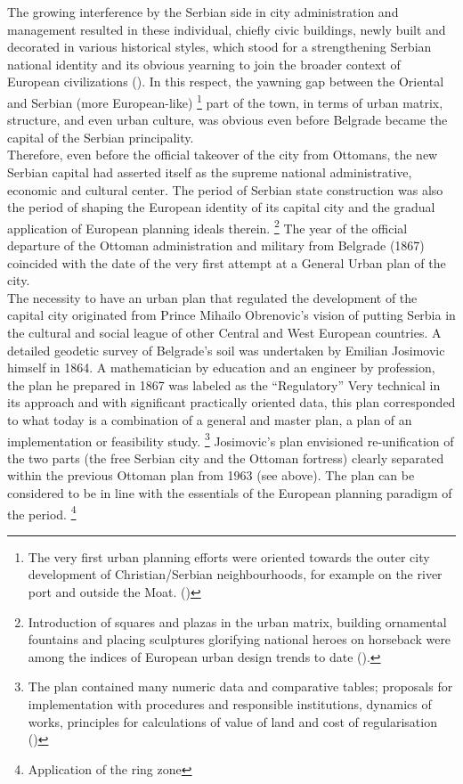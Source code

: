 \documentclass[11pt]{report}
\begin{document}
The growing interference by the Serbian side in city administration and management resulted in these individual, chiefly civic buildings, newly built and decorated in various historical styles, which stood for a strengthening Serbian national identity and its obvious yearning to join the broader context of European civilizations (\href{Hirt}{\citealt{hirt_belgrade_2009}}).
In this respect, the yawning gap between the Oriental and Serbian (more European-like)
\footnote{The very first urban planning efforts were oriented towards the outer city development of Christian/Serbian neighbourhoods, for example on the river port and outside the Moat. (\href{Blagojevic}{\citealt{blagojevic_urban_2009}})}
part of the town, in terms of urban matrix, structure, and even urban culture, was obvious even before Belgrade became the capital of the Serbian principality.
\\

Therefore, even before the official takeover of the city from Ottomans, the new Serbian capital had asserted itself as the supreme national administrative, economic and cultural center.  The period of Serbian state construction was also the period of shaping the European identity of its capital city and the gradual application of European planning ideals therein.
\footnote{Introduction of squares and plazas in the urban matrix, building ornamental fountains and placing sculptures glorifying national heroes on horseback were among the indices of European urban design trends to date (\href{Hirt}{\citealt{hirt_belgrade_2009}}).}
The year of the official departure of the Ottoman administration and military from Belgrade (1867) coincided with the date of the very first attempt at a General Urban plan of the city.
\\

The necessity to have an urban plan that regulated the development of the capital city originated from Prince Mihailo Obrenovic’s vision of putting Serbia in the cultural and social league of other Central and West European countries. A detailed geodetic survey of Belgrade’s soil was undertaken by Emilian Josimovic himself in 1864. A mathematician by education and an engineer by profession, the plan he prepared in 1867 was labeled as the “Regulatory” Very technical in its approach and with significant practically oriented data, this plan corresponded to what today is a combination of a general and master plan, a plan of an implementation or feasibility study.
\footnote{The plan contained many numeric data and comparative tables; proposals  for  implementation with procedures and responsible institutions, dynamics of works, principles for calculations of value of land and cost of regularisation (\href{Blagojevic}{\citealt{blagojevic_urban_2009}})}
Josimovic’s plan envisioned re-unification of the two parts (the free Serbian city and the Ottoman fortress) clearly separated within the previous Ottoman plan from 1963 (see above). The plan can be considered to be in line with the essentials of the European planning paradigm of the period.
\footnote{Application of the ring zone}
\\
\end{document}

